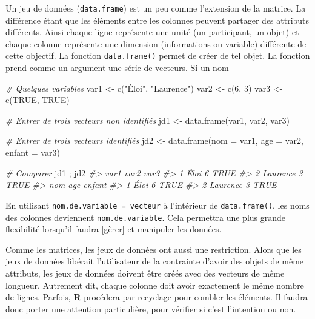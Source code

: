 \documentclass[
]{book}
\newenvironment{Shaded}{}{}
\newcommand{\AttributeTok}[1]{#1}
\newcommand{\CommentTok}[1]{\textit{#1}}
\newcommand{\ConstantTok}[1]{#1}
\newcommand{\DecValTok}[1]{#1}
\newcommand{\FunctionTok}[1]{#1}
\newcommand{\NormalTok}[1]{#1}
\newcommand{\OtherTok}[1]{#1}
\newcommand{\StringTok}[1]{#1}
\begin{document}
Un jeu de données (\texttt{data.frame}) est un peu comme l'extension de la matrice. La différence étant que les éléments entre les colonnes peuvent partager des attributs différents. Ainsi chaque ligne représente une unité (un participant, un objet) et chaque colonne représente une dimension (informations ou variable) différente de cette objectif. La fonction \texttt{data.frame()} permet de créer de tel objet. La fonction prend comme un argument une série de vecteurs. Si un nom

\begin{Shaded}
\begin{Highlighting}[]
\CommentTok{\# Quelques variables}
\NormalTok{var1 }\OtherTok{\textless{}{-}} \FunctionTok{c}\NormalTok{(}\StringTok{"Éloi"}\NormalTok{, }\StringTok{"Laurence"}\NormalTok{)}
\NormalTok{var2 }\OtherTok{\textless{}{-}} \FunctionTok{c}\NormalTok{(}\DecValTok{6}\NormalTok{, }\DecValTok{3}\NormalTok{)}
\NormalTok{var3 }\OtherTok{\textless{}{-}} \FunctionTok{c}\NormalTok{(}\ConstantTok{TRUE}\NormalTok{, }\ConstantTok{TRUE}\NormalTok{)}

\CommentTok{\# Entrer de trois vecteurs non identifiés}
\NormalTok{jd1 }\OtherTok{\textless{}{-}} \FunctionTok{data.frame}\NormalTok{(var1, var2, var3)}

\CommentTok{\# Entrer de trois vecteurs identifiés}
\NormalTok{jd2 }\OtherTok{\textless{}{-}} \FunctionTok{data.frame}\NormalTok{(}\AttributeTok{nom =}\NormalTok{ var1, }\AttributeTok{age =}\NormalTok{ var2, }\AttributeTok{enfant =}\NormalTok{ var3)}

\CommentTok{\# Comparer}
\NormalTok{jd1 ; jd2}
\CommentTok{\#\textgreater{}       var1 var2 var3}
\CommentTok{\#\textgreater{} 1     Éloi    6 TRUE}
\CommentTok{\#\textgreater{} 2 Laurence    3 TRUE}
\CommentTok{\#\textgreater{}        nom age enfant}
\CommentTok{\#\textgreater{} 1     Éloi   6   TRUE}
\CommentTok{\#\textgreater{} 2 Laurence   3   TRUE}
\end{Highlighting}
\end{Shaded}

En utilisant \texttt{nom.de.variable\ =\ vecteur} à l'intérieur de \texttt{data.frame()}, les noms des colonnes deviennent \texttt{nom.de.variable}. Cela permettra une plus grande flexibilité lorsqu'il faudra {[}gèrer{]} et \protect\hyperlink{manipuler}{manipuler} les données.

Comme les matrices, les jeux de données ont aussi une restriction. Alors que les jeux de données libérait l'utilisateur de la contrainte d'avoir des objets de même attributs, les jeux de données doivent être créés avec des vecteurs de même longueur. Autrement dit, chaque colonne doit avoir exactement le même nombre de lignes. Parfois, \textbf{R} procédera par recyclage pour combler les éléments. Il faudra donc porter une attention particulière, pour vérifier si c'est l'intention ou non.
\end{document}
